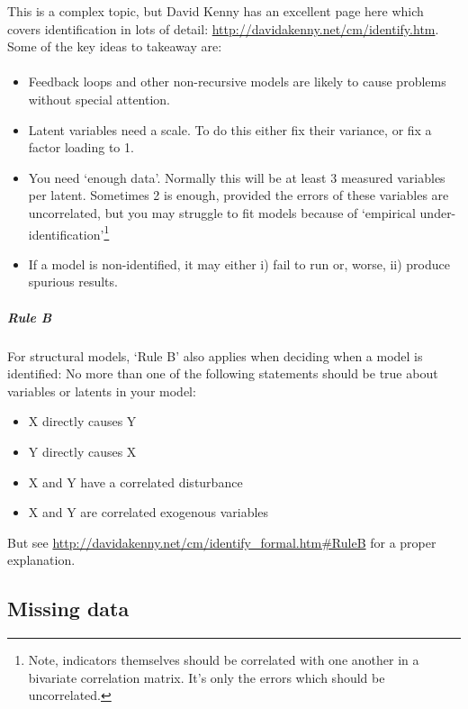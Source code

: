 \documentclass[]{article}
\providecommand{\tightlist}{%
  \setlength{\itemsep}{0pt}\setlength{\parskip}{0pt}}
\let\oldparagraph\paragraph
\renewcommand{\paragraph}[1]{\oldparagraph{#1}\mbox{}}
\let\oldsubparagraph\subparagraph
\renewcommand{\subparagraph}[1]{\oldsubparagraph{#1}\mbox{}}
\let\rmarkdownfootnote\footnote%
\def\footnote{\protect\rmarkdownfootnote}
\theoremstyle{definition}
\theoremstyle{definition}
\theoremstyle{definition}
\theoremstyle{remark}
\begin{document}
This is a complex topic, but David Kenny has an excellent page here
which covers identification in lots of detail:
\url{http://davidakenny.net/cm/identify.htm}. Some of the key ideas to
takeaway are:

\hypertarget{identification-recursion}{\paragraph{}\label{identification-recursion}}

\begin{itemize}
\item
  Feedback loops and other non-recursive models are likely to cause
  problems without special attention.
\item
  Latent variables need a scale. To do this either fix their variance,
  or fix a factor loading to 1.
\item
  You need `enough data'. Normally this will be at least 3 measured
  variables per latent. Sometimes 2 is enough, provided the errors of
  these variables are uncorrelated, but you may struggle to fit models
  because of `empirical under-identification'\footnote{Note, indicators
    themselves should be correlated with one another in a bivariate
    correlation matrix. It's only the errors which should be
    uncorrelated.}
\item
  If a model is non-identified, it may either i) fail to run or, worse,
  ii) produce spurious results.
\end{itemize}

\subparagraph{Rule B}\label{rule-b}

For structural models, `Rule B' also applies when deciding when a model
is identified: No more than one of the following statements should be
true about variables or latents in your model:

\begin{itemize}
\tightlist
\item
  X directly causes Y
\item
  Y directly causes X
\item
  X and Y have a correlated disturbance
\item
  X and Y are correlated exogenous variables
\end{itemize}

But see \url{http://davidakenny.net/cm/identify_formal.htm\#RuleB} for a
proper explanation.

\subsection*{Missing data}\label{cfa-sem-missing-data}
\end{document}
